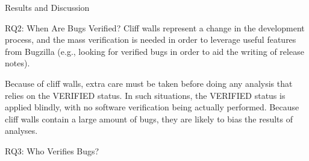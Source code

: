 \begin{section}{Results and Discussion}
\begin{subsection}{RQ2: When Are Bugs Verified?}
	Cliff walls represent a change in the development process, and the mass verification is needed in order to leverage useful features from Bugzilla (e.g., looking for verified bugs in order to aid the writing of release notes).
	
	Because of cliff walls, extra care must be taken before doing any analysis that relies on the VERIFIED status. In such situations, the VERIFIED status is applied blindly, with no software verification being actually performed. Because cliff walls contain a large amount of bugs, they are likely to bias the results of analyses.
	
	
	
	
	
	
	
	
\end{subsection}

\begin{subsection}{RQ3: Who Verifies Bugs?}
	

\end{subsection}
\end{section}
